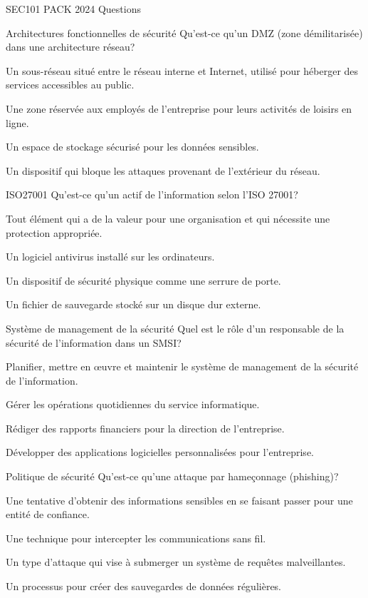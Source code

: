 \documentclass[12pt]{article}
\begin{document}
\begin{quiz}{SEC101 PACK 2024 Questions}
\begin{multi}[points=1]{Architectures fonctionnelles de sécurité}
Qu'est-ce qu'un DMZ (zone démilitarisée) dans une architecture réseau?
\item* Un sous-réseau situé entre le réseau interne et Internet, utilisé pour héberger des services accessibles au public.
\item Une zone réservée aux employés de l'entreprise pour leurs activités de loisirs en ligne.
\item Un espace de stockage sécurisé pour les données sensibles.
\item Un dispositif qui bloque les attaques provenant de l'extérieur du réseau.
\end{multi}

\begin{multi}[points=1]{ISO27001}
Qu'est-ce qu'un actif de l'information selon l'ISO 27001?
\item* Tout élément qui a de la valeur pour une organisation et qui nécessite une protection appropriée.
\item Un logiciel antivirus installé sur les ordinateurs.
\item Un dispositif de sécurité physique comme une serrure de porte.
\item Un fichier de sauvegarde stocké sur un disque dur externe.
\end{multi}

\begin{multi}[points=1]{Système de management de la sécurité}
Quel est le rôle d'un responsable de la sécurité de l'information dans un SMSI?
\item* Planifier, mettre en œuvre et maintenir le système de management de la sécurité de l'information.
\item Gérer les opérations quotidiennes du service informatique.
\item Rédiger des rapports financiers pour la direction de l'entreprise.
\item Développer des applications logicielles personnalisées pour l'entreprise.
\end{multi}

\begin{multi}[points=1]{Politique de sécurité}
Qu'est-ce qu'une attaque par hameçonnage (phishing)?
\item* Une tentative d'obtenir des informations sensibles en se faisant passer pour une entité de confiance.
\item Une technique pour intercepter les communications sans fil.
\item Un type d'attaque qui vise à submerger un système de requêtes malveillantes.
\item Un processus pour créer des sauvegardes de données régulières.
\end{multi}


\end{quiz}
\end{document}
